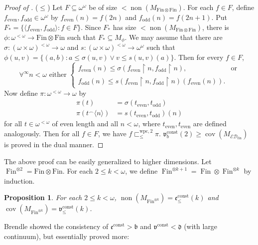 \documentclass[a4paper,12pt]{amsart}
\newtheorem{prop}[thm]{Proposition}
\theoremstyle{definition}
\numberwithin{thm}{section}
\numberwithin{equation}{section}
\newcommand{\bb}{\mathfrak{b}}
\newcommand{\dd}{\mathfrak{d}}
\newcommand{\ee}{\mathfrak{e}}
\DeclareMathOperator{\non}{non}
\DeclareMathOperator{\cov}{cov}
\DeclareMathOperator{\Fin}{Fin}
\newcommand{\edfin}{\mathcal{ED}_\mathrm{fin}}
\newcommand{\finfin}{\mathrm{Fin}\otimes\mathrm{Fin}}
\renewcommand{\subset}{\subseteq}
\newcommand{\eec}{\ee^{\mathrm{const}}}
\newcommand{\vv}{\mathfrak{v}}
\newcommand{\vvc}{\vv^{\mathrm{const}}}
\begin{document}
\begin{proof}[Proof of ]
        ($\leq$) Let $F\subset\omega^\omega$ be of size $<\non(M_{\finfin})$. For each $f\in F$, define $f_\mathrm{even}, f_\mathrm{odd}\in\omega^\omega$ by $f_\mathrm{even}(n) = f(2n)$ and $f_\mathrm{odd}(n) = f(2n+1)$. Put $F_* = \{\langle f_\mathrm{even}, f_\mathrm{odd}\rangle:f\in F\}$. Since $F_*$ has size $<\non(M_{\finfin})$, there is $\phi\colon\omega^{<\omega}\to\finfin$ such that $F_*\subset M_{\phi}$. We may assume that there are $\sigma\colon(\omega\times\omega)^{<\omega}\to\omega$ and $s\colon(\omega\times\omega)^{<\omega}\to\omega^\omega$ such that $\phi(u, v) = \{(a, b): a\leq\sigma(u, v)\lor v\leq s(u, v)(a)\}$. Then for every $f\in F$,
        \[
        \forall^\infty n<\omega\text{ either }
    		\begin{cases}
    			f_\mathrm{even}(n)\leq\sigma(f_\mathrm{even}\upharpoonright n, f_\mathrm{odd}\upharpoonright n), & \text{or} \\
    			f_\mathrm{odd}(n)\leq s(f_\mathrm{even}\upharpoonright n, f_\mathrm{odd}\upharpoonright n)(f_\mathrm{even}(n)).         &
    		\end{cases}
        \]
        Now define $\pi\colon\omega^{<\omega}\to\omega$ by
        \begin{align*}
            \pi(t) &= \sigma(t_\mathrm{even}, t_\mathrm{odd})\\
            \pi(t^{\frown}\langle n\rangle) &= s(t_\mathrm{even}, t_\mathrm{odd})(n)
        \end{align*}
        for all $t\in\omega^{<\omega}$ of even length and all $n<\omega$, where $t_\mathrm{even},t_\mathrm{even}$ are defined analogously. Then for all $f\in F$, we have $f\sqsubset^{\mathrm{wpc}, 2}_{\leq}\pi$. $\vv^{\mathrm{const}}_b(2)\geq\cov(M_{\edfin})$ is proved in the dual manner.
    \end{proof}

    The above proof can be easily generalized to higher dimensions. Let $\Fin^{\otimes 2} = \finfin$. For each $2\leq k <\omega$, we define $\Fin^{\otimes k+1} = \Fin\otimes\Fin^{\otimes k}$ by induction.

    \begin{prop}
        For each $2\leq k<\omega$, $\non(M_{\mathrm{Fin}^{\otimes k}}) = \ee^\mathrm{const}_{\leq}(k)$ and $\cov(M_{\mathrm{Fin}^{\otimes k}}) = \vv^{\mathrm{const}}_{\leq}(k)$.
    \end{prop}
    
    Brendle \cite[Theorem 3.6(b)]{Bre03} showed the consistency of $\eec>\bb$ and $\vvc<\dd$ (with large continuum), but essentially proved more:
    
\end{document}
